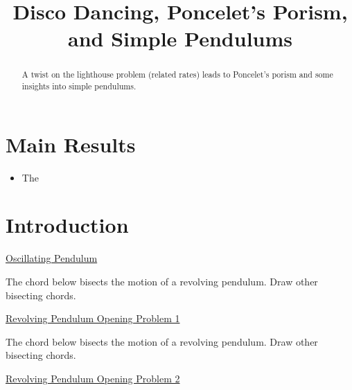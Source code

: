 \documentclass{ximera}
\title{Disco Dancing, Poncelet's Porism, and Simple Pendulums}
\begin{document}
\begin{abstract}
A twist on the lighthouse problem (related rates) leads to Poncelet's porism and some insights into simple pendulums.
\end{abstract}
\maketitle

\section*{Main Results}

\begin{itemize}

\item{The}

\end{itemize}


\section{Introduction}

\begin{exploration}


\begin{onlineOnly}
    \begin{center}
\end{center}
\end{onlineOnly}

\href{https://www.desmos.com/calculator/wmyk3ioe3t}{Oscillating Pendulum}



\end{exploration}

\begin{exploration}
The chord below bisects the motion of a revolving pendulum. Draw other bisecting chords.

\begin{onlineOnly}
    \begin{center}
\end{center}
\end{onlineOnly}

\href{https://www.desmos.com/calculator/zlyigzhmpn}{Revolving Pendulum Opening Problem 1}

\end{exploration}

\begin{exploration}
The chord below bisects the motion of a revolving pendulum. Draw other bisecting chords.

\begin{onlineOnly}
    \begin{center}
\end{center}
\end{onlineOnly}

\href{https://www.desmos.com/calculator/hqajtdhr31}{Revolving Pendulum Opening Problem 2}

\end{exploration}
\end{document}
